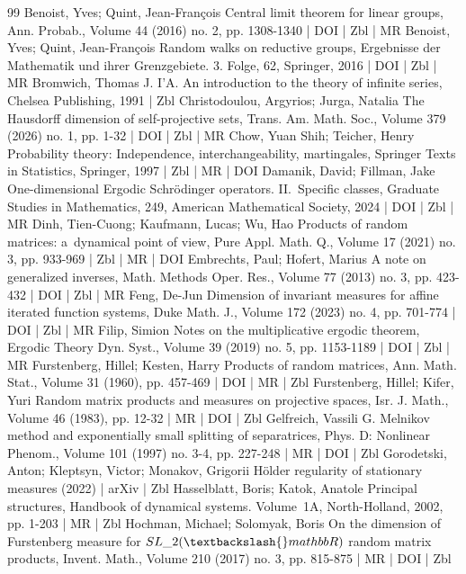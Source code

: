 \documentclass[10pt]{amsart}
\theoremstyle{definition}\newtheorem{defi}[theo]{Definition}\newtheorem{rema}[theo]{Remark}\newtheorem{exam}[theo]{Example}\newtheorem{exem}[theo]{Example}\newtheorem{nota}[theo]{Notation}
\begin{document}
\begin{thebibliography}{99}
 Benoist, Yves; Quint, Jean-François Central limit theorem for linear groups, Ann. Probab., Volume 44 (2016) no. 2, pp. 1308-1340 | DOI | Zbl | MR
 Benoist, Yves; Quint, Jean-François Random walks on reductive groups, Ergebnisse der Mathematik und ihrer Grenzgebiete. 3. Folge, 62, Springer, 2016 | DOI | Zbl | MR
 Bromwich, Thomas J. I’A. An introduction to the theory of infinite series, Chelsea Publishing, 1991 | Zbl
 Christodoulou, Argyrios; Jurga, Natalia The Hausdorff dimension of self-projective sets, Trans. Am. Math. Soc., Volume 379 (2026) no. 1, pp. 1-32 | DOI | Zbl | MR
 Chow, Yuan Shih; Teicher, Henry Probability theory: Independence, interchangeability, martingales, Springer Texts in Statistics, Springer, 1997 | Zbl | MR | DOI
 Damanik, David; Fillman, Jake One-dimensional Ergodic Schrödinger operators. II. Specific classes, Graduate Studies in Mathematics, 249, American Mathematical Society, 2024 | DOI | Zbl | MR
 Dinh, Tien-Cuong; Kaufmann, Lucas; Wu, Hao Products of random matrices: a dynamical point of view, Pure Appl. Math. Q., Volume 17 (2021) no. 3, pp. 933-969 | Zbl | MR | DOI
 Embrechts, Paul; Hofert, Marius A note on generalized inverses, Math. Methods Oper. Res., Volume 77 (2013) no. 3, pp. 423-432 | DOI | Zbl | MR
 Feng, De-Jun Dimension of invariant measures for affine iterated function systems, Duke Math. J., Volume 172 (2023) no. 4, pp. 701-774 | DOI | Zbl | MR
 Filip, Simion Notes on the multiplicative ergodic theorem, Ergodic Theory Dyn. Syst., Volume 39 (2019) no. 5, pp. 1153-1189 | DOI | Zbl | MR
 Furstenberg, Hillel; Kesten, Harry Products of random matrices, Ann. Math. Stat., Volume 31 (1960), pp. 457-469 | DOI | MR | Zbl
 Furstenberg, Hillel; Kifer, Yuri Random matrix products and measures on projective spaces, Isr. J. Math., Volume 46 (1983), pp. 12-32 | MR | DOI | Zbl
 Gelfreich, Vassili G. Melnikov method and exponentially small splitting of separatrices, Phys. D: Nonlinear Phenom., Volume 101 (1997) no. 3-4, pp. 227-248 | MR | DOI | Zbl
 Gorodetski, Anton; Kleptsyn, Victor; Monakov, Grigorii Hölder regularity of stationary measures (2022) | arXiv | Zbl
 Hasselblatt, Boris; Katok, Anatole Principal structures, Handbook of dynamical systems. Volume 1A, North-Holland, 2002, pp. 1-203 | MR | Zbl
 Hochman, Michael; Solomyak, Boris On the dimension of Furstenberg measure for ${SL}\_{2}(\textbackslash{}mathbb{R})$ random matrix products, Invent. Math., Volume 210 (2017) no. 3, pp. 815-875 | MR | DOI | Zbl

\end{thebibliography}
\end{document}

